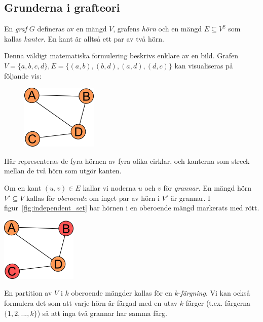 \documentclass[a4paper]{report}
\begin{document}
\subsection{Grunderna i grafteori}

En \emph{graf} $G$ defineras av en mängd $V$, grafens \emph{hörn} och en mängd $E \subseteq V^2$ som kallas \emph{kanter}. En kant är alltså ett par av två hörn.

Denna väldigt matematiska formulering beskrivs enklare av en bild. Grafen $V = \{a, b, c, d\}, E = \{(a, b), (b, d), (a, d), (d, c)\}$ kan visualiseras på följande vis:

\begin{figure}[h]
    \centering
    \includegraphics{graf.png}
\end{figure}

Här representeras de fyra hörnen av fyra olika cirklar, och kanterna som streck mellan de två hörn som utgör kanten.

Om en kant $(u, v) \in E$ kallar vi noderna $u$ och $v$ för \emph{grannar}. En mängd hörn $V' \subseteq V$ kallas för \emph{oberoende} om inget par av hörn i $V'$ är grannar. I figur~\ref{fig:independent_set} har hörnen i en oberoende mängd
markerats med rött.

\begin{center}
    \centering
    \includegraphics{oberoende_graf.png}
\label{fig:independent_set}
\end{center}

En partition av $V$ i $k$ oberoende mängder kallas för en $k$-\emph{färgning}. Vi kan också formulera det som att varje hörn är färgad
med en utav $k$ färger (t.ex. färgerna $\{1, 2, ..., k\}$) så att inga två grannar har samma färg.
\end{document}

